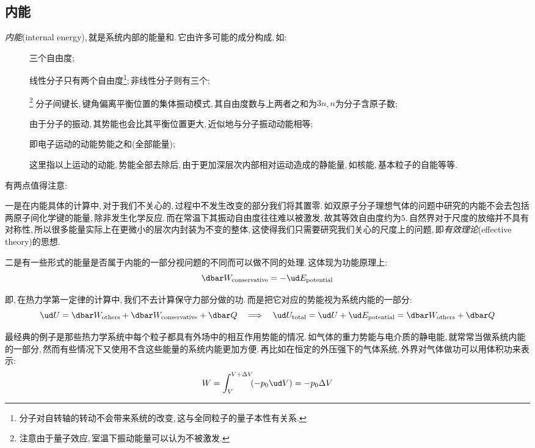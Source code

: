 \subsection{内能}
\emph{内能}(internal energy),\,就是系统内部的能量和.\,它由许多可能的成分构成,\,如:
\begin{description}
	\item[\quad {}]		三个自由度;
	\item[\quad {}]		线性分子只有两个自由度\footnote{分子对自转轴的转动不会带来系统的改变,\,这与全同粒子的量子本性有关系.};\,非线性分子则有三个;
	\item[\quad {}]\footnote{注意由于量子效应,\,室温下振动能量可以认为不被激发.}		分子间键长,\,键角偏离平衡位置的集体振动模式,\,其自由度数与上两者之和为$3n$,\,$n$为分子含原子数;
	\item[\quad {}]		由于分子的振动,\,其势能也会比其平衡位置更大,\,近似地与分子振动动能相等;
	\item[\quad {}]				即电子运动的动能势能之和(全部能量);
	\item[\quad {}]				这里指以上运动的动能,\,势能全部去除后,\,由于更加深层次内部相对运动造成的静能量,\,如核能,\,基本粒子的自能等等.
\end{description}

有两点值得注意:

一是在内能具体的计算中,\,对于我们不关心的,\,过程中不发生改变的部分我们将其置零.\,如双原子分子理想气体的问题中研究的内能不会去包括两原子间化学键的能量,\,除非发生化学反应.\,而在常温下其振动自由度往往难以被激发,\,故其等效自由度约为$5$.\,自然界对于尺度的放缩并不具有对称性,\,所以很多能量实际上在更微小的层次内封装为不变的整体,\,这使得我们只需要研究我们关心的尺度上的问题,\,即\emph{有效理论}(effective theory)的思想.

二是有一些形式的能量是否属于内能的一部分视问题的不同而可以做不同的处理.\,这体现为功能原理上:
\[\dbar W_{\rm conservative}=-\ud E_{\rm potential}\]

即,\,在热力学第一定律的计算中,\,我们不去计算保守力部分做的功.\,而是把它对应的势能视为系统内能的一部分:
\[\ud U=\dbar W_{\rm others} + \dbar W_{\rm conservative} +\dbar Q \quad \Longrightarrow \quad \ud U_{\rm total}=\ud U + \ud E_{\rm potential}=\dbar W_{\rm others}+\dbar Q\]

最经典的例子是那些热力学系统中每个粒子都具有外场中的相互作用势能的情况.\,如气体的重力势能与电介质的静电能,\,就常常当做系统内能的一部分,\,然而有些情况下又使用不含这些能量的系统内能更加方便.\,再比如在恒定的外压强下的气体系统,\,外界对气体做功可以用体积功来表示:
\[W=\int_{V}^{V+\Delta V} \!\!(-p_0 \ud V)=-p_0 \Delta V\]

